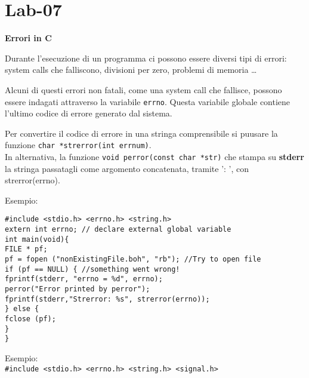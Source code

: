 \section{Lab-07}
\begin{flushleft}
  \textbf{Errori in C} \par 
  Durante l'esecuzione di un programma ci possono essere diversi tipi di errori: system 
  calls che falliscono, divisioni per zero, problemi di memoria \dots \par
  Alcuni di questi errori non fatali, come una system call che fallisce, possono essere 
  indagati attraverso la variabile \texttt{errno}. Questa variabile globale contiene l’ultimo 
  codice di errore generato dal sistema. \par 
  Per convertire il codice di errore in una stringa comprensibile si pu\aco usare la 
  funzione \texttt{char *strerror(int errnum)}. \\
  In alternativa, la funzione \texttt{void perror(const char *str)} che stampa su 
  \textbf{stderr} la stringa passatagli come argomento concatenata, tramite ': ', con 
  strerror(errno). 
  \begin{flushleft}
    Esempio: \par 
    \texttt{\#include <stdio.h> <errno.h> <string.h> \\
            extern int errno; // declare external global variable\\
            int main(void)\{\\
            \halftab FILE * pf;\\
            \halftab pf = fopen ("nonExistingFile.boh", "rb"); //Try to open file\\
            \halftab if (pf == NULL) \{ //something went wrong!\\
            \tab fprintf(stderr, "errno = \%d\n", errno); \\
            \tab perror("Error printed by perror");\\
            \tab fprintf(stderr,"Strerror: \%s\n", strerror(errno));\\
            \halftab \} else \{\\
            \tab fclose (pf);\\
            \halftab \} \\
            \}}
  \end{flushleft}
  \begin{flushleft}
    Esempio: \\
    \texttt{\#include <stdio.h> <errno.h> <string.h> <signal.h>\\
}
\end{flushleft}
\end{flushleft}
